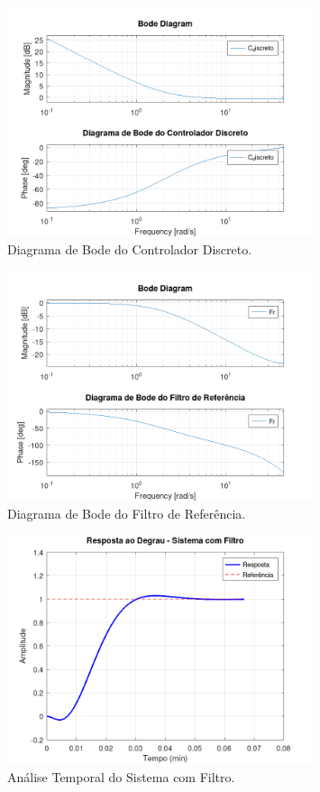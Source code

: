 \documentclass[a4paper,12pt]{article}
\begin{document}
\begin{figure}[H]
    \centering
    \includegraphics[width=0.8\textwidth]{figura_bode_controlador.png}
    \caption{Diagrama de Bode do Controlador Discreto.}
    \label{fig:bode_controlador}
\end{figure}

\begin{figure}[H]
    \centering
    \includegraphics[width=0.8\textwidth]{figura_bode_filtro.png}
    \caption{Diagrama de Bode do Filtro de Referência.}
    \label{fig:bode_filtro}
\end{figure}

\begin{figure}[H]
    \centering
    \includegraphics[width=0.8\textwidth]{figura_analise_temporal.png}
    \caption{Análise Temporal do Sistema com Filtro.}
    \label{fig:analise_temporal_main}
\end{figure}
\end{document}
